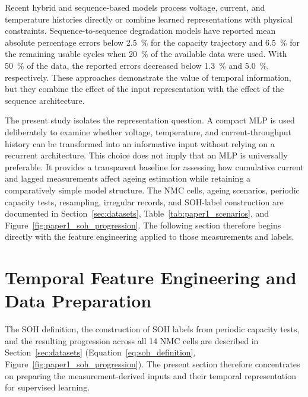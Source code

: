 \documentclass[
    a4paper,
    12pt,
    titlepage,
    bibliography=totoc,
    twoside=on,
    parskip=false,
    numbers=noenddot,
    cleardoublepage=empty,
    DIV=12,
    BCOR=12.0mm,
    headheight=36pt,
    headings=openright
]{scrreprt}
\begin{document}
Recent hybrid and sequence-based models process voltage, current, and temperature histories directly or combine learned representations with physical constraints. Sequence-to-sequence degradation models have reported mean absolute percentage errors below \SI{2.5}{\percent} for the capacity trajectory and \SI{6.5}{\percent} for the remaining usable cycles when \SI{20}{\percent} of the available data were used. With \SI{50}{\percent} of the data, the reported errors decreased below \SI{1.3}{\percent} and \SI{5.0}{\percent}, respectively.\autocite{xuNovelHybridPhysicsBased2023,pangPhysicsinformedNeuralNetwork2023,kimEstimationLiionBattery2018,chaouiAgingPredictionState2017} These approaches demonstrate the value of temporal information, but they combine the effect of the input representation with the effect of the sequence architecture.

The present study isolates the representation question. A compact MLP is used deliberately to examine whether voltage, temperature, and current-throughput history can be transformed into an informative input without relying on a recurrent architecture. This choice does not imply that an MLP is universally preferable. It provides a transparent baseline for assessing how cumulative current and lagged measurements affect ageing estimation while retaining a comparatively simple model structure. The NMC cells, ageing scenarios, periodic capacity tests, resampling, irregular records, and SOH-label construction are documented in Section~\ref{sec:datasets}, Table~\ref{tab:paper1_scenarios}, and Figure~\ref{fig:paper1_soh_progression}. The following section therefore begins directly with the feature engineering applied to those measurements and labels.

\section{Temporal Feature Engineering and Data Preparation}
The SOH definition, the construction of SOH labels from periodic capacity tests, and the resulting progression across all 14 NMC cells are described in Section~\ref{sec:datasets} (Equation~\ref{eq:soh_definition}, Figure~\ref{fig:paper1_soh_progression}). The present section therefore concentrates on preparing the measurement-derived inputs and their temporal representation for supervised learning.
\end{document}
